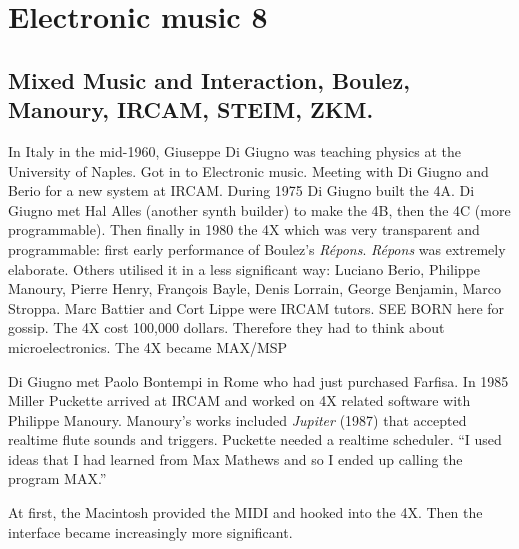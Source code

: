 
\chapter{Electronic music 8}
\label{history8}

\section{Mixed Music and Interaction, Boulez, Manoury, IRCAM, STEIM, ZKM.}

In Italy in the mid-1960, Giuseppe Di Giugno was teaching physics at the University of Naples.  Got in to Electronic music.  Meeting with Di Giugno and Berio for a new system at IRCAM.  During 1975 Di Giugno built the 4A.  Di Giugno met Hal Alles (another synth builder) to make the 4B, then the 4C (more programmable).  Then finally in 1980 the 4X which was very transparent and programmable: first early performance of Boulez's \textit{R\'epons}.  \textit{R\'epons} was extremely elaborate.  Others utilised it in a less significant way: Luciano Berio, Philippe Manoury, Pierre Henry, François Bayle, Denis Lorrain, George Benjamin, Marco Stroppa.  Marc Battier and Cort Lippe were IRCAM tutors. SEE BORN here for gossip. The 4X cost 100,000 dollars.  Therefore they had to think about microelectronics. The 4X became MAX/MSP 

Di Giugno met Paolo Bontempi in Rome who had just purchased Farfisa.  In 1985 Miller Puckette arrived at IRCAM and worked on 4X related software with Philippe Manoury.  Manoury's works included \textit{Jupiter} (1987) that accepted realtime flute sounds and triggers. Puckette needed a realtime scheduler. ``I used ideas that I had learned from Max Mathews and so I ended up calling the program MAX.''

At first, the Macintosh provided the MIDI and hooked into the 4X.  Then the interface became increasingly more significant. 




